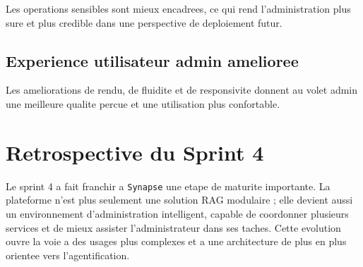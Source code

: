 Les operations sensibles sont mieux encadrees, ce qui rend l'administration plus sure et plus credible dans une perspective de deploiement futur.

\subsection{Experience utilisateur admin amelioree}

Les ameliorations de rendu, de fluidite et de responsivite donnent au volet admin une meilleure qualite percue et une utilisation plus confortable.

\section{Retrospective du Sprint 4}

Le sprint 4 a fait franchir a \texttt{Synapse} une etape de maturite importante. La plateforme n'est plus seulement une solution RAG modulaire ; elle devient aussi un environnement d'administration intelligent, capable de coordonner plusieurs services et de mieux assister l'administrateur dans ses taches. Cette evolution ouvre la voie a des usages plus complexes et a une architecture de plus en plus orientee vers l'agentification.
